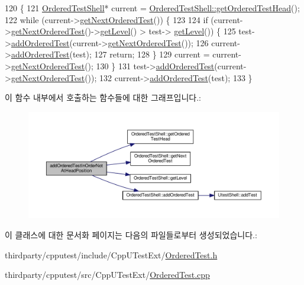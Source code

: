 \begin{DoxyCode}
120 \{
121     \hyperlink{class_ordered_test_shell}{OrderedTestShell}* current = 
      \hyperlink{class_ordered_test_shell_aef5fc03b5fa044b44e480305bc90482f}{OrderedTestShell::getOrderedTestHead}();
122     \textcolor{keywordflow}{while} (current->\hyperlink{class_ordered_test_shell_a5550aaad71e37f9ecd5cfb12e5c213e0}{getNextOrderedTest}()) \{
123 
124         \textcolor{keywordflow}{if} (current->\hyperlink{class_ordered_test_shell_a5550aaad71e37f9ecd5cfb12e5c213e0}{getNextOrderedTest}()->\hyperlink{class_ordered_test_shell_a8c6fea79d2b1d923386e86255bcf9317}{getLevel}() > test->
      \hyperlink{class_ordered_test_shell_a8c6fea79d2b1d923386e86255bcf9317}{getLevel}()) \{
125             test->\hyperlink{class_ordered_test_shell_a6ddc87f6649a3c0161e4bd837efef9d7}{addOrderedTest}(current->\hyperlink{class_ordered_test_shell_a5550aaad71e37f9ecd5cfb12e5c213e0}{getNextOrderedTest}());
126             current->\hyperlink{class_ordered_test_shell_a6ddc87f6649a3c0161e4bd837efef9d7}{addOrderedTest}(test);
127             \textcolor{keywordflow}{return};
128         \}
129         current = current->\hyperlink{class_ordered_test_shell_a5550aaad71e37f9ecd5cfb12e5c213e0}{getNextOrderedTest}();
130     \}
131     test->\hyperlink{class_ordered_test_shell_a6ddc87f6649a3c0161e4bd837efef9d7}{addOrderedTest}(current->\hyperlink{class_ordered_test_shell_a5550aaad71e37f9ecd5cfb12e5c213e0}{getNextOrderedTest}());
132     current->\hyperlink{class_ordered_test_shell_a6ddc87f6649a3c0161e4bd837efef9d7}{addOrderedTest}(test);
133 \}
\end{DoxyCode}


이 함수 내부에서 호출하는 함수들에 대한 그래프입니다.\+:
\nopagebreak
\begin{figure}[H]
\begin{center}
\leavevmode
\includegraphics[width=350pt]{class_ordered_test_installer_a06dca4e5ace29ea63dbf99fabfee1212_cgraph}
\end{center}
\end{figure}




이 클래스에 대한 문서화 페이지는 다음의 파일들로부터 생성되었습니다.\+:\begin{DoxyCompactItemize}
\item 
thirdparty/cpputest/include/\+Cpp\+U\+Test\+Ext/\hyperlink{_ordered_test_8h}{Ordered\+Test.\+h}\item 
thirdparty/cpputest/src/\+Cpp\+U\+Test\+Ext/\hyperlink{_ordered_test_8cpp}{Ordered\+Test.\+cpp}\end{DoxyCompactItemize}
